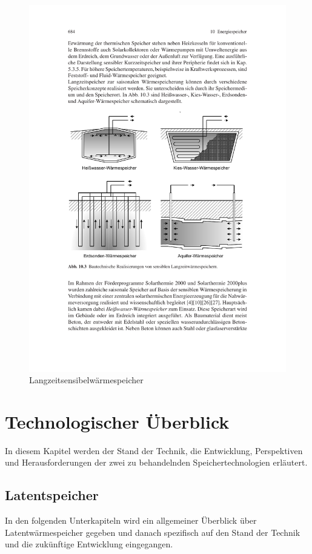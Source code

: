 \documentclass[11pt,a4paper]{scrartcl}
\begin{document}
\begin{figure}[h]
\begin{center}
\includegraphics[scale=1]{images/langzeitspeicher.pdf}
\caption{Langzeitsensibelwärmespeicher \cite{Wesselak}}
\label{fig:Langzeitspeicher}
\end{center}
\end{figure}

\section{Technologischer Überblick}
In diesem Kapitel werden der Stand der Technik, die Entwicklung, Perspektiven
und Herausforderungen der zwei zu behandelnden Speichertechnologien erläutert.
\subsection{Latentspeicher}
In den folgenden Unterkapiteln wird ein allgemeiner Überblick über
Latentwärmespeicher gegeben und danach spezifisch auf den Stand der Technik und
die zukünftige Entwicklung eingegangen.
\end{document}
